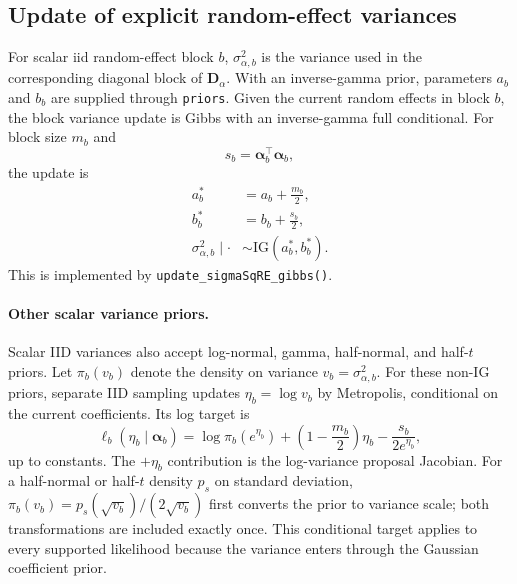 \documentclass[11pt]{article}
\newcommand{\balpha}{\bm{\alpha}}
\newcommand{\bD}{\bm{D}}
\newcommand{\trans}{^\top}
\begin{document}
\subsection{Update of explicit random-effect variances}

For scalar iid random-effect block $b$, $\sigma^2_{\alpha,b}$ is the variance used in the corresponding diagonal block of $\bD_\alpha$. With an inverse-gamma prior, parameters $a_b$ and $b_b$ are supplied through \texttt{priors}. Given the current random effects in block $b$, the block variance update is Gibbs with an inverse-gamma full conditional. For block size $m_b$ and
\begin{equation}
  s_b = \balpha_b\trans \balpha_b,
\end{equation}
the update is
\begin{equation}
\begin{aligned}
  a_b^\ast &= a_b + \frac{m_b}{2}, \\
  b_b^\ast &= b_b + \frac{s_b}{2}, \\
  \sigma^2_{\alpha,b} \mid \cdot &\sim
    \mathrm{IG}(a_b^\ast, b_b^\ast).
\end{aligned}
\end{equation}
This is implemented by \texttt{update\_sigmaSqRE\_gibbs()}.

\paragraph{Other scalar variance priors.}
Scalar IID variances also accept log-normal, gamma, half-normal, and half-$t$
priors. Let $\pi_b(v_b)$ denote the density on variance $v_b=\sigma^2_{\alpha,b}$.
For these non-IG priors, separate IID sampling updates $\eta_b=\log v_b$ by
Metropolis, conditional on the current coefficients. Its log target is
\begin{equation}\label{eq:iid-conditional-variance-target}
 \ell_b(\eta_b\mid\balpha_b)
 =\log\pi_b(e^{\eta_b})+\left(1-\frac{m_b}{2}\right)\eta_b
   -\frac{s_b}{2e^{\eta_b}},
\end{equation}
up to constants. The $+\eta_b$ contribution is the log-variance proposal
Jacobian. For a half-normal or half-$t$ density $p_s$ on standard deviation,
$\pi_b(v_b)=p_s(\sqrt{v_b})/(2\sqrt{v_b})$ first converts the prior to variance
scale; both transformations are included exactly once. This conditional target
applies to every supported likelihood because the variance enters through
the Gaussian coefficient prior.
\end{document}
